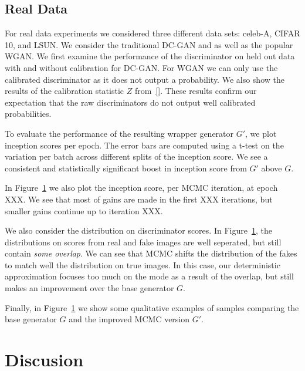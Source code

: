 \documentclass{article}
\begin{document}
\subsection{Real Data}
For real data experiments we considered three different data sets: celeb-A, CIFAR 10, and LSUN\@.
We consider the traditional DC-GAN and as well as the popular WGAN\@.  %
We first examine the performance of the discriminator on held out data with and without calibration for DC-GAN\@.
For WGAN we can only use the calibrated discriminator as it does not output a probability.
We also show the results of the calibration statistic $Z$ from~\eqref{}.
These results confirm our expectation that the raw discriminators do not output well calibrated probabilities.

To evaluate the performance of the resulting wrapper generator $G'$, we plot inception scores per epoch.
The error bars are computed using a t-test on the variation per batch across different splits of the inception score.
We see a consistent and statistically significant boost in inception score from $G'$ above $G$.

In Figure~\ref{} we also plot the inception score, per MCMC iteration, at epoch XXX.  %
We see that most of gains are made in the first XXX iterations, but smaller gains continue up to iteration XXX.  %

We also consider the distribution on discriminator scores.
In Figure~\ref{}, the distributions on scores from real and fake images are well seperated, but still contain \emph{some overlap}.
We can see that MCMC shifts the distribution of the fakes to match well the distribution on true images.
In this case, our deterministic approximation focuses too much on the mode as a result of the overlap, but still makes an improvement over the base generator $G$.

Finally, in Figure~\ref{} we show some qualitative examples of samples comparing the base generator $G$ and the improved MCMC version $G'$.

\section{Discusion}
\end{document}
